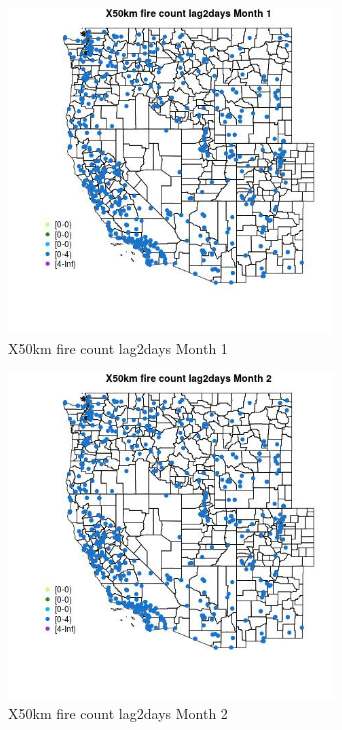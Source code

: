 \begin{figure} 
\centering  
\includegraphics[width=0.77\textwidth]{Code_Outputs/Report_ML_input_PM25_Step4_part_e_de_duplicated_aves_compiled_2019-05-14wNAs_MapObsMo1X50km_fire_count_lag2days.jpg} 
\caption{\label{fig:Report_ML_input_PM25_Step4_part_e_de_duplicated_aves_compiled_2019-05-14wNAsMapObsMo1X50km_fire_count_lag2days}X50km fire count lag2days Month 1} 
\end{figure} 
 

\begin{figure} 
\centering  
\includegraphics[width=0.77\textwidth]{Code_Outputs/Report_ML_input_PM25_Step4_part_e_de_duplicated_aves_compiled_2019-05-14wNAs_MapObsMo2X50km_fire_count_lag2days.jpg} 
\caption{\label{fig:Report_ML_input_PM25_Step4_part_e_de_duplicated_aves_compiled_2019-05-14wNAsMapObsMo2X50km_fire_count_lag2days}X50km fire count lag2days Month 2} 
\end{figure} 
 

